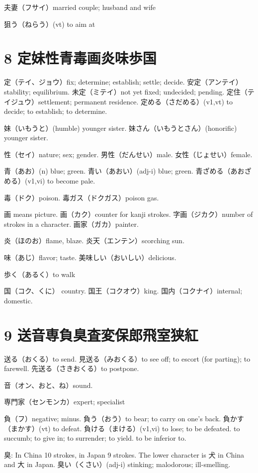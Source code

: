 夫妻（フサイ）married couple; husband and wife

狙う（ねらう）(vt) to aim at

\section{8 定妹性青毒画炎味歩国}

定（テイ、ジョウ）fix; determine; establish; settle; decide.
安定（アンテイ）stability; equilibrium.
未定（ミテイ）not yet fixed; undecided; pending.
定住（テイジュウ）settlement; permanent residence.
定める（さだめる）(v1,vt) to decide; to establish; to determine.

妹（いもうと）(humble) younger sister.
妹さん（いもうとさん）(honorific) younger sister.

性（セイ）nature; sex; gender.
男性（だんせい）male.
女性（じょせい）female.

青（あお）(n) blue; green.
青い（あおい）(adj-i) blue; green.
青ざめる（あおざめる）(v1,vi) to become pale.

毒（ドク）poison.
毒ガス（ドクガス）poison gas.

画 means picture.
画（カク）counter for kanji strokes.
字画（ジカク）number of strokes in a character.
画家（ガカ）painter.

炎（ほのお）flame, blaze.
炎天（エンテン）scorching sun.

味（あじ）flavor; taste.
美味しい（おいしい）delicious.

歩く（あるく）to walk

国（コク、くに） country.
国王（コクオウ）king.
国内（コクナイ）internal; domestic.

\section{9 送音専負臭査変保郎飛室狭紅}

送る（おくる）to send.
見送る（みおくる）to see off; to escort (for parting); to farewell.
先送る（さきおくる）to postpone.

音（オン、おと、ね）sound.

専門家（センモンカ）expert; specialist

負（フ）negative; minus.
負う（おう）to bear; to carry on one's back.
負かす（まかす）(vt) to defeat.
負ける（まける）(v1,vi)
to lose; to be defeated.
to succumb; to give in; to surrender; to yield.
to be inferior to.

臭: In China 10 strokes, in Japan 9 strokes.
The lower character is 犬 in China and 大 in Japan.
臭い（くさい）(adj-i) stinking; malodorous; ill-smelling.


